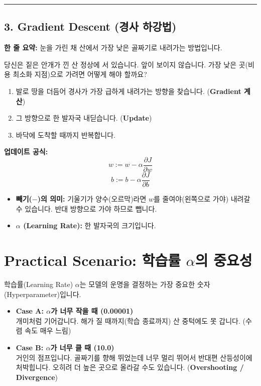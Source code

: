 \documentclass[11pt,a4paper]{book}
\theoremstyle{definition}
\begin{document}
\vspace{0.5cm}\hrule\vspace{0.5cm}

\subsection{3. Gradient Descent (경사 하강법)}
\textbf{한 줄 요약:} 눈을 가린 채 산에서 가장 낮은 골짜기로 내려가는 방법입니다.


\begin{analogybox}[title={안개 낀 산 하산하기}]
당신은 짙은 안개가 낀 산 정상에 서 있습니다. 앞이 보이지 않습니다.
가장 낮은 곳(비용 최소화 지점)으로 가려면 어떻게 해야 할까요?
\begin{enumerate}
    \item 발로 땅을 더듬어 경사가 가장 급하게 내려가는 방향을 찾습니다. (\textbf{Gradient 계산})
    \item 그 방향으로 한 발자국 내딛습니다. (\textbf{Update})
    \item 바닥에 도착할 때까지 반복합니다.
\end{enumerate}
\end{analogybox}

\textbf{업데이트 공식:}
$$ w := w - \alpha \frac{\partial J}{\partial w} $$
$$ b := b - \alpha \frac{\partial J}{\partial b} $$
\begin{itemize}
    \item \textbf{빼기($-$)의 의미:} 기울기가 양수(오르막)라면 $w$를 줄여야(왼쪽으로 가야) 내려갈 수 있습니다. 반대 방향으로 가야 하므로 뺍니다.
    \item \textbf{$\alpha$ (Learning Rate):} 한 발자국의 크기입니다.
\end{itemize}

\section{Practical Scenario: 학습률 $\alpha$의 중요성}

학습률(Learning Rate) $\alpha$는 모델의 운명을 결정하는 가장 중요한 숫자(Hyperparameter)입니다.

\begin{itemize}
    \item \textbf{Case A: $\alpha$가 너무 작을 때 (0.00001)} \\
    개미처럼 기어갑니다. 해가 질 때까지(학습 종료까지) 산 중턱에도 못 갑니다. (수렴 속도 매우 느림)
    
    \item \textbf{Case B: $\alpha$가 너무 클 때 (10.0)} \\
    거인의 점프입니다. 골짜기를 향해 뛰었는데 너무 멀리 뛰어서 반대편 산등성이에 처박힙니다. 오히려 더 높은 곳으로 올라갈 수도 있습니다. (\textbf{Overshooting / Divergence})
\end{itemize}
\end{document}
